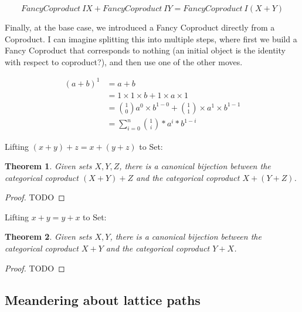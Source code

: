 \documentclass{proc-l}
\newtheorem{theorem}{Theorem}[section]
\theoremstyle{definition}
\theoremstyle{remark}
\numberwithin{equation}{section}
\begin{document}
\[
FancyCoproduct~I X + FancyCoproduct~I Y = FancyCoproduct~I (X + Y)
\]


Finally, at the base case, we introduced a Fancy Coproduct directly from a Coproduct. I can imagine splitting this into multiple steps,
where first we build a Fancy Coproduct that corresponds to nothing (an initial object is the identity with respect to coproduct?), and then use one of the other moves.





\begin{align*}
(a + b)^1 & = a + b \\ %
& = 1 \times 1 \times b + 1 \times a \times 1 \\ %
& = {1 \choose 0} a^0 \times b^{1-0} + {1 \choose 1} \times a^1 \times b^{1-1} \\ %
& = \sum_{i=0}^n {1 \choose i} * a^i * b^{1-i} %
\end{align*}



Lifting \((x + y) + z = x + (y + z)\) to Set:

\begin{theorem}
Given sets \(X, Y, Z\), there is a canonical bijection between the categorical coproduct \((X + Y) + Z\) and the categorical coproduct \(X + (Y + Z)\).
\end{theorem}

\begin{proof}
TODO
\end{proof} 


Lifting \(x + y = y + x\) to Set:

\begin{theorem}
Given sets \(X, Y\), there is a canonical bijection between the categorical coproduct \(X + Y\) and the categorical coproduct \(Y + X\).
\end{theorem}

\begin{proof}
TODO
\end{proof}

\subsection{Meandering about lattice paths}
\end{document}
